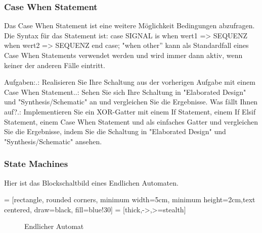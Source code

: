 \documentclass{article}
\begin{document}
\subsubsection{Case When Statement}
Das Case When Statement ist eine weitere M\"oglichkeit Bedingungen abzufragen. Die Syntax f\"ur das Statement ist:\newline
case SIGNAL is\newline
when wert1 =>\newline
SEQUENZ\newline
when wert2 =>\newline
SEQUENZ\newline
end case;\newline
"when other'' kann als Standardfall eines Case When Statements verwendet werden und wird immer dann aktiv, wenn keiner der anderen F\"alle eintritt.\newline

Aufgaben:.: Realisieren Sie Ihre Schaltung aus der vorherigen Aufgabe mit einem Case When Statement..: Sehen Sie sich Ihre Schaltung in "Elaborated Design" und "Synthesis/Schematic" an und vergleichen Sie die Ergebnisse. Was f\"allt Ihnen auf?.: Implementieren Sie ein XOR-Gatter mit einem If Statement, einem If Elsif Statement, einem Case When Statement und als einfaches Gatter und vergleichen Sie die Ergebnisse, indem Sie die Schaltung in "Elaborated Design" und "Synthesis/Schematic" ansehen.

\subsubsection{State Machines}
Hier ist das Blockschaltbild eines Endlichen Automaten.\newline

 = [rectangle, rounded corners, minimum width=5cm, minimum height=2cm,text centered, draw=black, fill=blue!30]
 = [thick,->,>=stealth]
\begin{figure}[H]
\begin{center}
\caption{Endlicher Automat}
\end{center}
\end{figure}
\end{document}
